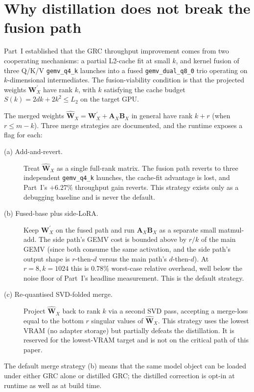 \documentclass[11pt]{article}
\providecommand{\Amat}{\mathbf{A}}
\providecommand{\Bmat}{\mathbf{B}}
\providecommand{\Wmat}{\mathbf{W}}
\begin{document}
\section{Why distillation does not break the fusion path}
\label{sec:fusion-fit}

Part~I established that the GRC throughput improvement comes from
two cooperating mechanisms: a partial L2-cache fit at small $k$, and
kernel fusion of three Q/K/V \texttt{gemv\_q4\_k} launches into a fused
\texttt{gemv\_dual\_q8\_0} trio operating on $k$-dimensional
intermediates. The fusion-viability condition is that the projected
weights $\Wmat_X^\prime$ have rank $k$, with $k$ satisfying the cache
budget $S(k) = 2dk + 2k^2 \le L_2$ on the target GPU.

The merged weights $\hat{\Wmat}_X = \Wmat_X^\prime + \Amat_X \Bmat_X$
in general have rank $k+r$ (when $r \le m - k$). Three merge
strategies are documented, and the runtime exposes a flag for each:

\begin{description}
\item[(a) Add-and-revert.] Treat $\hat{\Wmat}_X$ as a single
      full-rank matrix. The fusion path reverts to three independent
      \texttt{gemv\_q4\_k} launches, the cache-fit advantage is lost,
      and Part~I's $+6.27\%$ throughput gain reverts. This strategy
      exists only as a debugging baseline and is never the default.
\item[(b) Fused-base plus side-LoRA.] Keep $\Wmat_X^\prime$ on the
      fused path and run $\Amat_X \Bmat_X$ as a separate small
      matmul-add. The side path's GEMV cost is bounded above by
      $r/k$ of the main GEMV (since both consume the same activation,
      and the side path's output shape is $r$-then-$d$ versus the main
      path's $d$-then-$d$). At $r{=}8, k{=}1024$ this is $0.78\%$
      worst-case relative overhead, well below the noise floor of
      Part~I's headline measurement. This is the default strategy.
\item[(c) Re-quantised SVD-folded merge.] Project $\hat{\Wmat}_X$
      back to rank $k$ via a second SVD pass, accepting a
      merge-loss equal to the bottom $r$ singular values of
      $\hat{\Wmat}_X$. This strategy uses the lowest VRAM (no adapter
      storage) but partially defeats the distillation. It is reserved
      for the lowest-VRAM target and is not on the critical path of
      this paper.
\end{description}

The default merge strategy (b) means that the same model object can
be loaded under either GRC alone or distilled GRC; the distilled
correction is opt-in at runtime as well as at build time.
\end{document}

